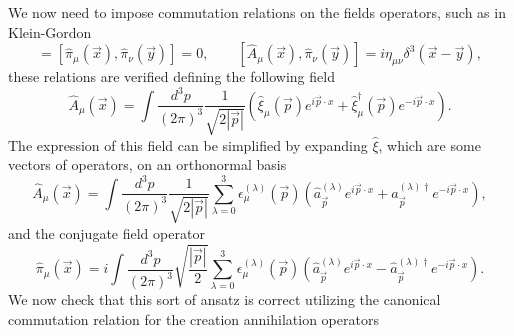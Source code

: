 We now need to impose commutation relations on the fields operators, such as in Klein-Gordon
\begin{equation*}
    [\hat{A}_\mu(\vec x),\hat{A}_\nu(\vec y)]=[\hat{\pi}_\mu(\vec x),\hat{\pi}_\nu(\vec y)]=0,\qquad  [\hat{A}_\mu(\vec x),\hat{\pi}_\nu(\vec y)]=i\eta_{\mu\nu}\delta^3(\vec x-\vec y),
\end{equation*}
these relations are verified defining the following field
\begin{equation*}
    \hat{A}_\mu(\vec x)=\int\frac{d^3p}{(2\pi)^3}\frac{1}{\sqrt{2|\vec p|}}(\hat{\xi}_\mu(\vec p)e^{i\vec p\cdot x}+\hat{\xi}_\mu^\dagger(\vec p)e^{-i\vec p\cdot x}).
\end{equation*}
The expression of this field can be simplified by expanding $\hat{\xi}$, which are some vectors of operators, on an orthonormal basis
\begin{equation*}
    \hat{A}_\mu(\vec x)=\int\frac{d^3p}{(2\pi)^3}\frac{1}{\sqrt{2|\vec p|}}\sum_{\lambda=0}^{3}\epsilon_\mu^{(\lambda)}(\vec p)(\hat{a}^{(\lambda)}_{\vec p}e^{i\vec p\cdot x}+\hat{a}^{(\lambda)\dagger}_{\vec p}e^{-i\vec p\cdot x}),
\end{equation*}
and the conjugate field operator
\begin{equation*}
    \hat{\pi}_\mu(\vec x)=i\int\frac{d^3p}{(2\pi)^3}\sqrt{\frac{|\vec p|}{2}}\sum_{\lambda=0}^{3}\epsilon_\mu^{(\lambda)}(\vec p)(\hat{a}_{\vec p}^{(\lambda)}e^{i\vec p\cdot x}-\hat{a}^{(\lambda)\dagger}_{\vec p}e^{-i\vec p\cdot x}).
\end{equation*}
We now check that this sort of ansatz is correct utilizing the canonical commutation relation for the creation annihilation operators
